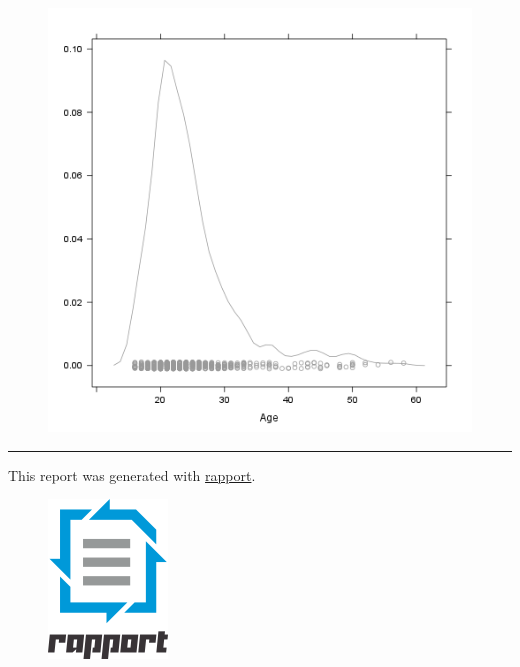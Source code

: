 \documentclass{article}
\makeatletter
\def\maxwidth{\ifdim\Gin@nat@width>\linewidth\linewidth
\else\Gin@nat@width\fi}
\let\Oldincludegraphics\includegraphics
\renewcommand{\includegraphics}[1]{\Oldincludegraphics[width=\maxwidth]{#1}}
\makeatother
\begin{document}
\begin{figure}[htbp]
\centering
\includegraphics{2684e7da9f9797bfd75863b18d9d29e9.png}
\caption{}
\end{figure}

\begin{center}\rule{3in}{0.4pt}\end{center}

This report was generated with
\href{http://rapport-package.info/}{rapport}.

\begin{figure}[htbp]
\centering
\includegraphics{images/rapport.png}
\caption{}
\end{figure}
\end{document}

